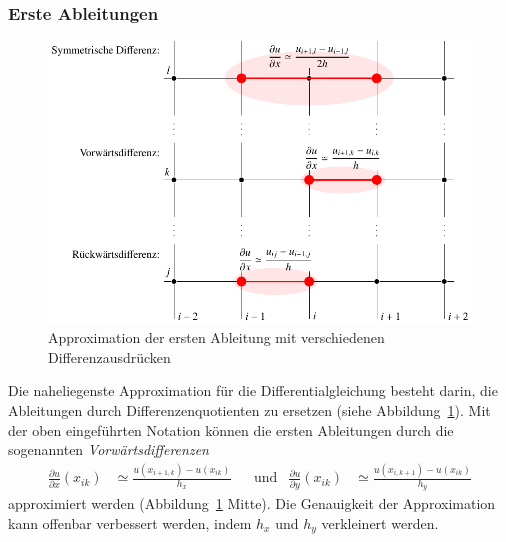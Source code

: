 \subsubsection{Erste Ableitungen}
\begin{figure}
\centering
\includegraphics{chapters/70-pde/images/derivatives.pdf}
\caption{Approximation der ersten Ableitung mit verschiedenen
Differenzausdrücken
\label{buch:pde:1abldiff}}
\end{figure}
Die naheliegenste Approximation für die Differentialgleichung besteht
darin, die Ableitungen durch Differenzenquotienten zu ersetzen (siehe 
Abbildung~\ref{buch:pde:1abldiff}).
Mit der oben eingeführten Notation können die ersten Ableitungen durch
die sogenannten {\em Vorwärtsdifferenzen}
%
\begin{align}
\frac{\partial u}{\partial x} (x_{ik}) 
&\simeq
\frac{u(x_{i+1,k}) - u(x_{ik})}{h_x}
&
&\text{und}
&
\frac{\partial u}{\partial y} (x_{ik}) 
&\simeq
\frac{u(x_{i,k+1}) - u(x_{ik})}{h_y}
\label{chapter:pde:approx1st}
\end{align}
approximiert werden (Abbildung~\ref{buch:pde:1abldiff} Mitte).
Die Genauigkeit der Approximation kann offenbar verbessert werden, 
indem $h_x$ und $h_y$ verkleinert werden.

